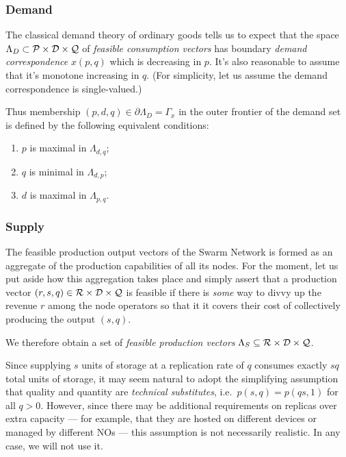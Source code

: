 \subsubsection{Demand}
\label{section:demand}
%
The classical demand theory of ordinary goods tells us to expect that the space $\Lambda_D\subset\mathcal{P}\times\mathcal{D}\times\mathcal{Q}$ of \emph{feasible consumption vectors} has boundary \emph{demand correspondence} $x(p,q)$ which is decreasing in $p$.
%
It's also reasonable to assume that it's monotone increasing in $q$.
%
(For simplicity, let us assume the demand correspondence is single-valued.)

Thus membership $(p,d,q)\in \partial\Lambda_D = \Gamma_x$ in the outer frontier of the demand set is defined by the following equivalent conditions:
%
\begin{enumerate}
  \item $p$ is maximal in $\Lambda_{d,q}$;
  \item $q$ is minimal in $\Lambda_{d,p}$;
  \item $d$ is maximal in $\Lambda_{p,q}$.
\end{enumerate}

\subsubsection{Supply}
\label{section:supply}
%
The feasible production output vectors of the Swarm Network is formed as an aggregate of the production capabilities of all its nodes.
%
For the moment, let us put aside how this aggregation takes place and simply assert that a production vector $(r,s,q)\in \mathcal{R}\times\mathcal{D}\times\mathcal{Q}$ is feasible if there is \emph{some} way to divvy up the revenue $r$ among the node operators so that it it covers their cost of collectively producing the output $(s,q)$.

We therefore obtain a set of \emph{feasible production vectors} $\Lambda_S\subseteq\mathcal{R}\times\mathcal{D}\times\mathcal{Q}$.

\begin{remark}

  Since supplying $s$ units of storage at a replication rate of $q$ consumes exactly $sq$ total units of storage, it may seem natural to adopt the simplifying assumption that quality and quantity are \emph{technical substitutes}, i.e.~$p(s,q)=p(qs,1)$ for all $q>0$.
  However, since there may be additional requirements on replicas over extra capacity --- for example, that they are hosted on different devices or managed by different NOs --- this assumption is not necessarily realistic.
  In any case, we will not use it.

\end{remark}

